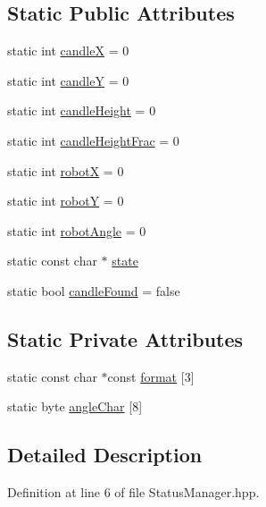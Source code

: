 \subsection*{Static Public Attributes}
\begin{DoxyCompactItemize}
\item 
static int \hyperlink{classStatusManager_a53de0b4eac2d76c8b2d075b8020d1c7f}{candle\-X} = 0
\item 
static int \hyperlink{classStatusManager_ac5a5ebf9f76a5ae36536be7fb2ce5383}{candle\-Y} = 0
\item 
static int \hyperlink{classStatusManager_a1a9f7a4fdb19e56e3f8352a78ea4648e}{candle\-Height} = 0
\item 
static int \hyperlink{classStatusManager_ac813f7d48ed51e0246126a53775c5b65}{candle\-Height\-Frac} = 0
\item 
static int \hyperlink{classStatusManager_a844d999c234bdcfcb0f465bdf2da9b72}{robot\-X} = 0
\item 
static int \hyperlink{classStatusManager_a2e09a9dcfcc6c38cae621c04f49c58b4}{robot\-Y} = 0
\item 
static int \hyperlink{classStatusManager_af55087be7ac997b2db4258b26c285f1d}{robot\-Angle} = 0
\item 
static const char $\ast$ \hyperlink{classStatusManager_a6f3c0467116c3bfbf9d7507cb04b7d5a}{state}
\item 
static bool \hyperlink{classStatusManager_addac8003cb381bc134170516966135aa}{candle\-Found} = false
\end{DoxyCompactItemize}
\subsection*{Static Private Attributes}
\begin{DoxyCompactItemize}
\item 
static const char $\ast$const \hyperlink{classStatusManager_a98bdd9d3e963455b576ff9a9bc5482ca}{format} \mbox{[}3\mbox{]}
\item 
static byte \hyperlink{classStatusManager_ad215f7e2fd44cebe76d6e60d40d110e6}{angle\-Char} \mbox{[}8\mbox{]}
\end{DoxyCompactItemize}


\subsection{Detailed Description}


Definition at line 6 of file Status\-Manager.\-hpp.




